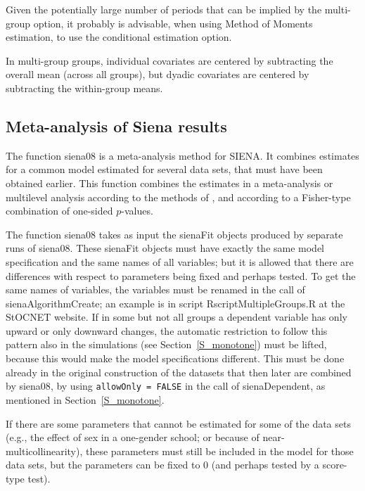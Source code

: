 \documentclass[a4paper,fleqn,11pt]{article}
\newcommand{\+}{\, + \,}
\newcommand{\sfn}[1]{\textsf{#1}}
\newcommand{\SN}{{\sf StOCNET }}
\newcommand{\si}{{\sf SIENA}}
\begin{document}
Given the potentially large number of periods that can be implied
by the multi-group option, it probably is advisable,
when using Method of Moments estimation, to use
the conditional estimation option.

In multi-group groups, individual covariates are centered by subtracting
the overall mean (across all groups), but dyadic covariates are centered
by subtracting the within-group means.



\subsection{Meta-analysis of Siena results}
\label{S_Siena08}

The function \textsf{siena08} is a meta-analysis method for \si.
It combines estimates for a common model
   estimated for several data sets,
   that must have been obtained earlier.
   This function combines
   the estimates in a meta-analysis or multilevel analysis
   according to the methods of \citet{SnijdersBaerveldt03},
   and according to a Fisher-type combination of one-sided $p$-values.

The function  \textsf{siena08} takes as input the \textsf{sienaFit}
objects produced by separate runs of  \textsf{siena08}.
These \textsf{sienaFit} objects must have exactly the same model
specification and the same names of all variables; but it is allowed
that there are differences with respect to parameters being fixed
and perhaps tested. To get the same names of variables, the
variables must be renamed in the call of \textsf{sienaAlgorithmCreate};
an example is in script \textsf{RscriptMultipleGroups.R} at the \SN website.
If in some but not all groups a dependent variable has only upward or
only downward changes, the automatic restriction to follow this pattern also
in the simulations (see Section~\ref{S_monotone}) must be lifted,
because this would make the model specifications different.
This must be done already in the original construction of the datasets that
then later are combined by \textsf{siena08},
by using \texttt{allowOnly = FALSE} in the call of \sfn{sienaDependent},
as mentioned in Section~\ref{S_monotone}.

If there are some parameters that cannot be estimated for some of the data sets
(e.g., the effect of sex in a one-gender school; or because of
near-multicollinearity), these parameters must still be included
in the model for those data sets, but the parameters can be fixed to 0
(and perhaps tested by a score-type test).
\medskip
\end{document}
